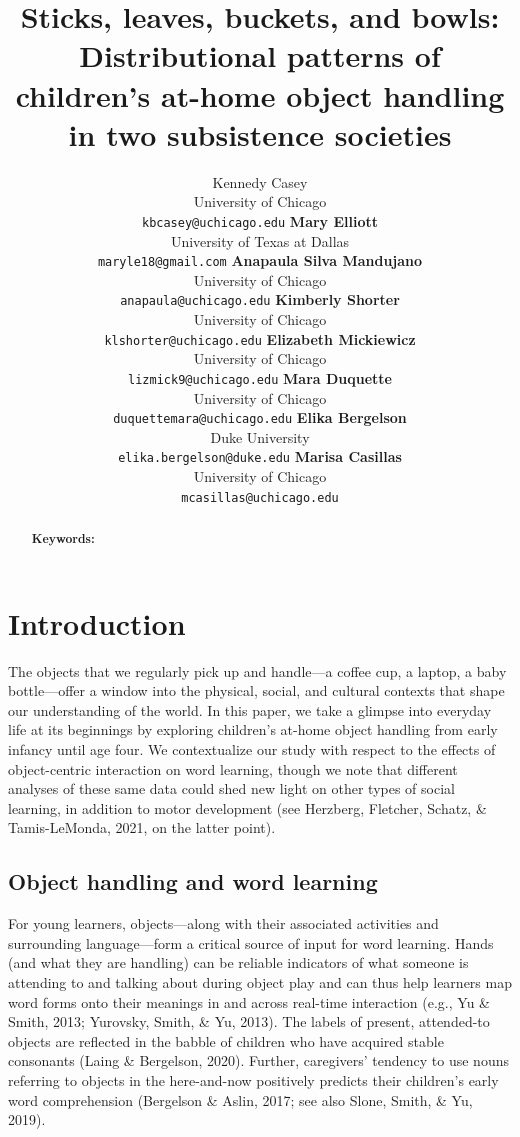 \documentclass[10pt, letterpaper]{article}
\title{Sticks, leaves, buckets, and bowls: Distributional patterns of
children's at-home object handling in two subsistence societies}
\author{Kennedy Casey \\
        University of Chicago \\
        \texttt{\small{kbcasey@uchicago.edu}}
\And \textbf{Mary Elliott} \\
             University of Texas at Dallas \\
             \texttt{\small{maryle18@gmail.com}}
\And \textbf{Anapaula Silva Mandujano} \\
             University of Chicago \\
             \texttt{\small{anapaula@uchicago.edu}}   
\And \textbf{Kimberly Shorter} \\
             University of Chicago \\
             \texttt{\small{klshorter@uchicago.edu}}
\AND \textbf{Elizabeth Mickiewicz} \\
             University of Chicago \\
             \texttt{\small{lizmick9@uchicago.edu}}         
\And \textbf{Mara Duquette} \\
             University of Chicago \\
             \texttt{\small{duquettemara@uchicago.edu}}
\And \textbf{Elika Bergelson} \\
             Duke University \\
             \texttt{\small{elika.bergelson@duke.edu}}
\And \textbf{Marisa Casillas} \\
             University of Chicago \\
             \texttt{\small{mcasillas@uchicago.edu}}}
\begin{document}
\maketitle

\begin{abstract}


\textbf{Keywords:}

\end{abstract}

\hypertarget{introduction}{%
\section{Introduction}\label{introduction}}

The objects that we regularly pick up and handle---a coffee cup, a
laptop, a baby bottle---offer a window into the physical, social, and
cultural contexts that shape our understanding of the world. In this
paper, we take a glimpse into everyday life at its beginnings by
exploring children's at-home object handling from early infancy until
age four. We contextualize our study with respect to the effects of
object-centric interaction on word learning, though we note that
different analyses of these same data could shed new light on other
types of social learning, in addition to motor development (see
Herzberg, Fletcher, Schatz, \& Tamis-LeMonda, 2021, on the latter
point).

\hypertarget{object-handling-and-word-learning}{%
\subsection{Object handling and word
learning}\label{object-handling-and-word-learning}}

For young learners, objects---along with their associated activities and
surrounding language---form a critical source of input for word
learning. Hands (and what they are handling) can be reliable indicators
of what someone is attending to and talking about during object play and
can thus help learners map word forms onto their meanings in and across
real-time interaction (e.g., Yu \& Smith, 2013; Yurovsky, Smith, \& Yu,
2013). The labels of present, attended-to objects are reflected in the
babble of children who have acquired stable consonants (Laing \&
Bergelson, 2020). Further, caregivers' tendency to use nouns referring
to objects in the here-and-now positively predicts their children's
early word comprehension (Bergelson \& Aslin, 2017; see also Slone,
Smith, \& Yu, 2019).
\end{document}
